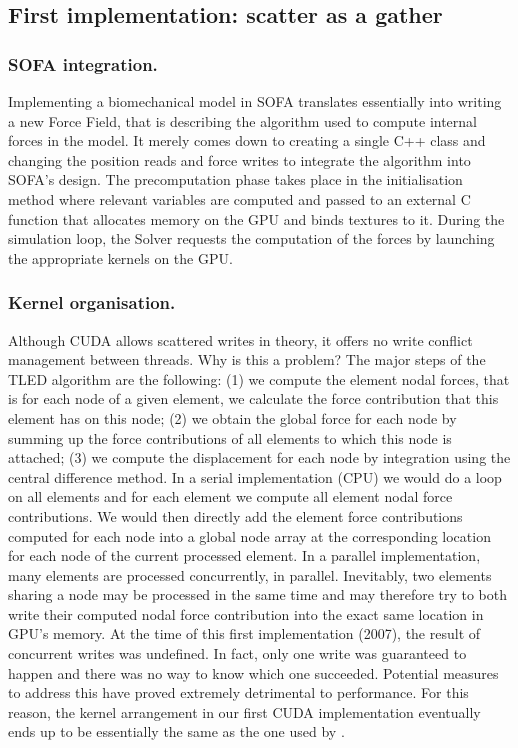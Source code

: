 	\subsection{First implementation: scatter as a gather}
	
\subsubsection*{SOFA integration.}
Implementing a biomechanical model in SOFA translates essentially into writing a new Force Field, that is describing the algorithm used to compute internal forces in the model. It merely comes down to creating a single C++ class and changing the position reads and force writes to integrate the algorithm into SOFA's design. The precomputation phase takes place in the initialisation method where relevant variables are computed and passed to an external C function that allocates memory on the GPU and binds textures to it. During the simulation loop, the Solver requests the computation of the forces by launching the appropriate kernels on the GPU.

\subsubsection*{Kernel organisation.}
Although CUDA allows scattered writes in theory, it offers no write conflict management between threads. Why is this a problem? The major steps of the TLED algorithm are the following: (1) we compute the element nodal forces, that is for each node of a given element, we calculate the force contribution that this element has on this node; (2) we obtain the global force for each node by summing up the force contributions of all elements to which this node is attached; (3) we compute the displacement for each node by integration using the central difference method. In a serial implementation (CPU) we would do a loop on all elements and for each element we compute all element nodal force contributions. We would then directly add the element force contributions computed for each node into a global node array at the corresponding location for each node of the current processed element. In a parallel implementation, many elements are processed concurrently, in parallel. Inevitably, two elements sharing a node may be processed in the same time and may therefore try to both write their computed nodal force contribution into the exact same location in GPU's memory. At the time of this first implementation (2007), the result of concurrent writes was undefined. In fact, only one write was guaranteed to happen and there was no way to know which one succeeded. Potential measures to address this have proved extremely detrimental to performance. For this reason, the kernel arrangement in our first CUDA implementation eventually ends up to be essentially the same as the one used by \cite{Taylor07b}.

